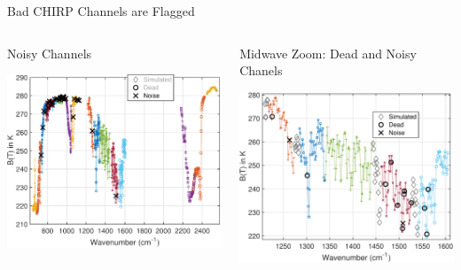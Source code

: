 \documentclass[10pt,t]{beamer}
\begin{document}
\begin{frame}[label={sec:orgd9668e0}]{Bad CHIRP Channels are Flagged}
\vspace{-0.25in}

\begin{columns}
\begin{column}{0.55\columnwidth}
\begin{block}{\footnotesize Noisy Channels}
\vspace{-0.05in}
\vspace{-0.05in}
\begin{center}
\includegraphics[width=0.77\linewidth]{./Figs/Pdf/a2c_full_show_noise.pdf}
\end{center}
\end{block}
\end{column}

\begin{column}{0.55\columnwidth}
\begin{block}{\footnotesize Midwave Zoom: Dead and Noisy Chanels}
\vspace{-0.05in}
\vspace{-0.05in}
\begin{center}
\includegraphics[width=0.77\linewidth]{./Figs/Pdf/a2c_full_show_dead_noise_water.pdf}
\end{center}
\end{block}
\end{column}
\end{columns}
\end{frame}
\end{document}
